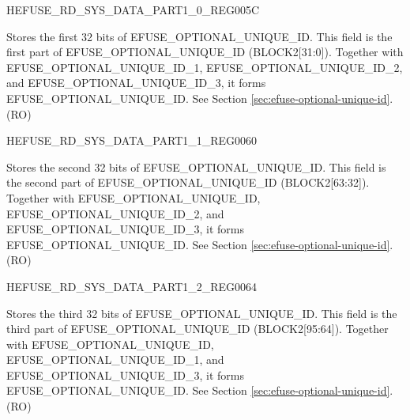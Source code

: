 \begin{register}{H}{EFUSE\_RD\_SYS\_DATA\_PART1\_0\_REG}{\hexprefix{}005C}\label{regdesc:EFUSERDSYSDATAPART10REG}\label{regdesc:EFUSERDSYSDATAPART1NREG}
%
\regnewline%
\begin{regdesc}\begin{reglist}
\label{fielddesc:EFUSEOPTIONALUNIQUEID}\item [EFUSE\_OPTIONAL\_UNIQUE\_ID] Stores the first 32 bits of EFUSE\_OPTIONAL\_UNIQUE\_ID. This field is the first part of EFUSE\_OPTIONAL\_UNIQUE\_ID (BLOCK2[31:0]). Together with EFUSE\_OPTIONAL\_UNIQUE\_ID\_1, EFUSE\_OPTIONAL\_UNIQUE\_ID\_2, and EFUSE\_OPTIONAL\_UNIQUE\_ID\_3, it forms EFUSE\_OPTIONAL\_UNIQUE\_ID. See Section \ref{sec:efuse-optional-unique-id}. (RO)
\end{reglist}\end{regdesc}
\end{register}


\begin{register}{H}{EFUSE\_RD\_SYS\_DATA\_PART1\_1\_REG}{\hexprefix{}0060}\label{regdesc:EFUSERDSYSDATAPART11REG}
%
\regnewline%
\begin{regdesc}\begin{reglist}
\label{fielddesc:EFUSEOPTIONALUNIQUEID1}\item [EFUSE\_OPTIONAL\_UNIQUE\_ID\_1] Stores the second 32 bits of EFUSE\_OPTIONAL\_UNIQUE\_ID. This field is the second part of EFUSE\_OPTIONAL\_UNIQUE\_ID (BLOCK2[63:32]). Together with EFUSE\_OPTIONAL\_UNIQUE\_ID, EFUSE\_OPTIONAL\_UNIQUE\_ID\_2, and EFUSE\_OPTIONAL\_UNIQUE\_ID\_3, it forms EFUSE\_OPTIONAL\_UNIQUE\_ID. See Section \ref{sec:efuse-optional-unique-id}. (RO)
\end{reglist}\end{regdesc}
\end{register}


\begin{register}{H}{EFUSE\_RD\_SYS\_DATA\_PART1\_2\_REG}{\hexprefix{}0064}\label{regdesc:EFUSERDSYSDATAPART12REG}
%
\regnewline%
\begin{regdesc}\begin{reglist}
\label{fielddesc:EFUSEOPTIONALUNIQUEID2}\item [EFUSE\_OPTIONAL\_UNIQUE\_ID\_2] Stores the third 32 bits of EFUSE\_OPTIONAL\_UNIQUE\_ID. This field is the third part of EFUSE\_OPTIONAL\_UNIQUE\_ID (BLOCK2[95:64]). Together with EFUSE\_OPTIONAL\_UNIQUE\_ID, EFUSE\_OPTIONAL\_UNIQUE\_ID\_1, and EFUSE\_OPTIONAL\_UNIQUE\_ID\_3, it forms EFUSE\_OPTIONAL\_UNIQUE\_ID. See Section \ref{sec:efuse-optional-unique-id}. (RO)
\end{reglist}\end{regdesc}
\end{register}



